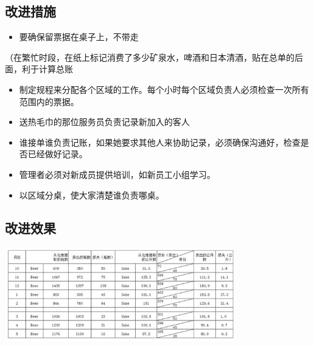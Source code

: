 \hypertarget{ux6539ux8fdbux63aaux65bd}{%
\subsection{改进措施}\label{ux6539ux8fdbux63aaux65bd}}

\begin{itemize}
\tightlist
\item
  要确保留票据在桌子上，不带走
\end{itemize}

（在繁忙时段，在纸上标记消费了多少矿泉水，啤酒和日本清酒，贴在总单的后面，利于计算总账

\begin{itemize}
\tightlist
\item
  制定规程来分配各个区域的工作。每个小时每个区域负责人必须检查一次所有范围内的票据。
\end{itemize}

\begin{itemize}
\tightlist
\item
  送热毛巾的那位服务员负责记录新加入的客人
\end{itemize}

\begin{itemize}
\tightlist
\item
  谁接单谁负责记账，如果她要求其他人来协助记录，必须确保沟通好，检查是否已经做好记录。
\end{itemize}

\begin{itemize}
\tightlist
\item
  管理者必须对新成员提供培训，如新员工小组学习。
\end{itemize}

\begin{itemize}
\tightlist
\item
  以区域分桌，使大家清楚谁负责哪桌。
\end{itemize}

\hypertarget{ux6539ux8fdbux6548ux679c}{%
\subsection{改进效果}\label{ux6539ux8fdbux6548ux679c}}


\includegraphics[width=10cm]{club191.jpg}

